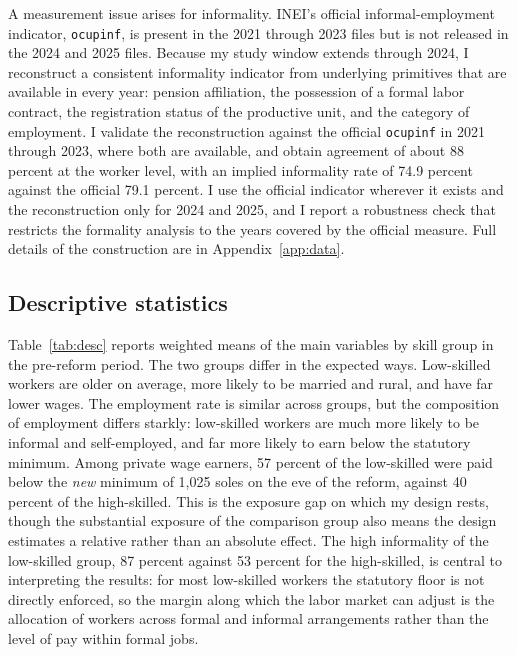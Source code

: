 A measurement issue arises for informality. INEI's official informal-employment
indicator, \texttt{ocupinf}, is present in the 2021 through 2023 files but is not
released in the 2024 and 2025 files. Because my study window extends through 2024, I
reconstruct a consistent informality indicator from underlying primitives that are
available in every year: pension affiliation, the possession of a formal labor
contract, the registration status of the productive unit, and the category of
employment. I validate the reconstruction against the official \texttt{ocupinf} in
2021 through 2023, where both are available, and obtain agreement of about 88 percent
at the worker level, with an implied informality rate of 74.9 percent against the
official 79.1 percent. I use the official indicator wherever it exists and the
reconstruction only for 2024 and 2025, and I report a robustness check that restricts
the formality analysis to the years covered by the official measure. Full details of
the construction are in Appendix~\ref{app:data}.

\subsection{Descriptive statistics}

Table~\ref{tab:desc} reports weighted means of the main variables by skill group in
the pre-reform period. The two groups differ in the expected ways. Low-skilled
workers are older on average, more likely to be married and rural, and have far lower
wages. The employment rate is similar across groups, but the composition of
employment differs starkly: low-skilled workers are much more likely to be informal
and self-employed, and far more likely to earn below the statutory minimum. Among
private wage earners, 57 percent of the low-skilled were paid below the \emph{new}
minimum of 1,025 soles on the eve of the reform, against 40 percent of the
high-skilled. This is the exposure gap on which my design rests, though the substantial
exposure of the comparison group also means the design estimates a relative rather
than an absolute effect. The high informality of the low-skilled group, 87 percent
against 53 percent for the high-skilled, is central to interpreting the results: for
most low-skilled workers the statutory floor is not directly enforced, so the margin
along which the labor market can adjust is the allocation of workers across formal and
informal arrangements rather than the level of pay within formal jobs.



